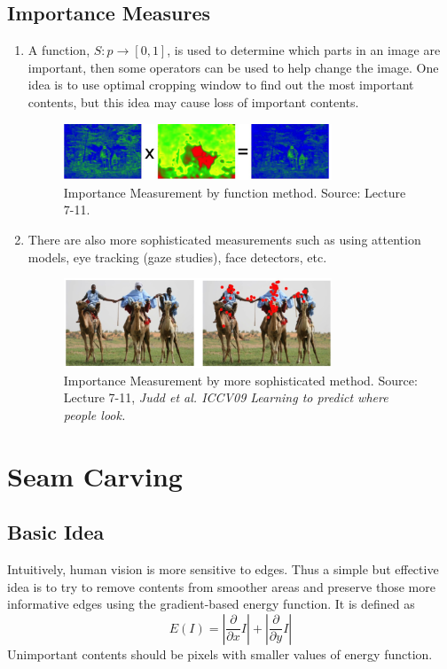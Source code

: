 \documentclass{article}
\begin{document}
\subsection{Importance Measures}
\begin{enumerate}
\item A function, $S: p \rightarrow [0,1]$, is used to determine which parts in an image are important, then some operators can be used to help change the image. One idea is to use optimal cropping window to find out the most important contents, but this idea may cause loss of important contents.
\begin{figure}[H]
\centering
\includegraphics[width=8cm]{Function.png}
\caption{Importance Measurement by function method. Source: Lecture 7-11.}
\end{figure}
\item There are also more sophisticated measurements such as using attention models, eye tracking (gaze studies), face detectors, etc.
\begin{figure}[H]
\centering
\includegraphics[width=8cm]{Tracking.png}
\caption{Importance Measurement by more sophisticated method. Source: Lecture 7-11, \textit{Judd et al. ICCV09 Learning to predict where people look.}}
\end{figure}
\end{enumerate}

\section{Seam Carving}
\subsection{Basic Idea}
Intuitively, human vision is more sensitive to edges. Thus a simple but effective idea is to try to remove contents from smoother areas and preserve those more informative edges using the gradient-based energy function. It is defined as
$$
E(I) = |\frac{\partial}{\partial x}I| + |\frac{\partial}{\partial y}I|
$$
Unimportant contents should be pixels with smaller values of energy function.
\end{document}
